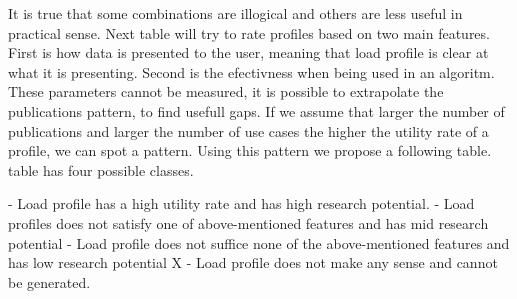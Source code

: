 It is true that some combinations are illogical and others are less useful in 
practical sense. Next table will try to rate profiles 
based on two main features. 
First is how data is presented to the user,
meaning that load profile is clear at what it is presenting.
Second is the efectivness when being used in an algoritm.
These parameters cannot be measured, it is possible
to extrapolate the publications pattern, to find 
usefull gaps. If we assume that larger the number of publications
and larger the number of use cases the higher the utility rate of a profile,
we can spot a pattern. 
Using this pattern we propose a following table. table has four possible classes. 

\begin{outline}
 - Load profile has a high utility rate and has high research potential. 
 - Load profiles does not satisfy one of above-mentioned features and has mid research potential
 - Load profile does not suffice none of the above-mentioned features and has low research potential
\1 X - Load profile does not make any sense and cannot be generated. 
\end{outline}

